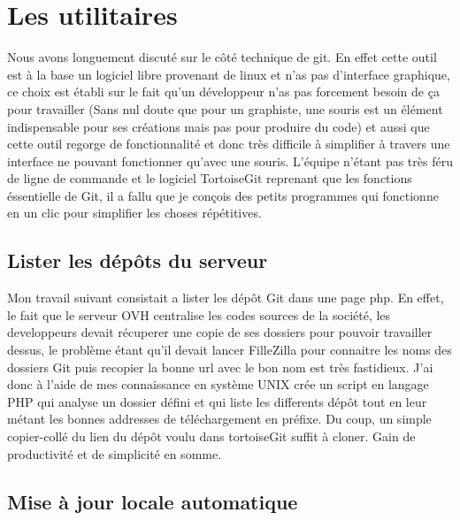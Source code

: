 \section{Les utilitaires} %

Nous avons longuement discuté sur le côté technique de git. En effet cette
outil est à la base un logiciel libre provenant de linux et n'as pas
d'interface graphique, ce choix est établi sur le fait qu'un développeur n'as
pas forcement besoin de ça pour travailler (Sans nul doute que pour un
graphiste, une souris est un élément indispensable pour ses créations mais pas
pour produire du code) et aussi que cette outil regorge de fonctionnalité et
donc très difficile à simplifier à travers une interface ne pouvant fonctionner
qu'avec une souris. L'équipe n'étant pas très féru de ligne de commande et le
logiciel TortoiseGit reprenant que les fonctions éssentielle de Git, il a fallu
que je conçois des petits programmes qui fonctionne en un clic pour simplifier
les choses répétitives.


\subsection{Lister les dépôts du serveur}

Mon travail suivant consistait a lister les dépôt Git dans une page php. En
effet, le fait que le serveur OVH centralise les codes sources de la société,
les developpeurs devait récuperer une copie de ses dossiers pour pouvoir
travailler dessus, le problème étant qu'il devait lancer FilleZilla pour
connaitre les noms des dossiers Git puis recopier la bonne url avec le bon nom
est très fastidieux. J'ai donc à l'aide de mes connaissance en système UNIX
crée un script en langage PHP qui analyse un dossier défini et qui liste les
differents dépôt tout en leur métant les bonnes addresses de téléchargement en
préfixe. Du coup, un simple copier-collé du lien du dépôt voulu dans
tortoiseGit suffit à cloner. Gain de productivité et de simplicité en somme.

\subsection{Mise à jour locale automatique} %

